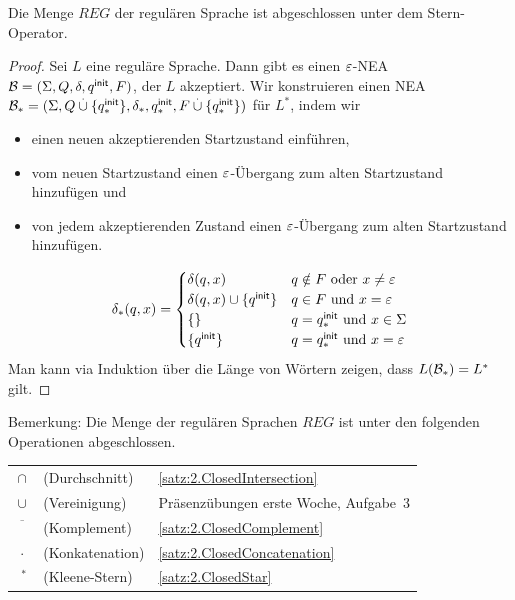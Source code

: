 \begin{lemma}\label{satz:2.ClosedStar}
Die Menge $REG$ der regulären Sprache ist abgeschlossen unter dem Stern-Operator.
\end{lemma}

\begin{proof}
Sei $L$ eine reguläre Sprache. Dann gibt es einen $\varepsilon$-NEA $\mathcal{B}=(\Sigma, Q, \delta, q^\mathsf{init}, F)$, der $L$ akzeptiert. 
Wir konstruieren einen NEA $\mathcal{B}_*=(\Sigma, Q\overset.\cup\{q^\mathsf{init}_*\}, \delta_*, q^\mathsf{init}_*, F\overset.\cup\{q^\mathsf{init}_*\})$ für $L^*$, indem wir
\begin{itemize}
 \item einen neuen akzeptierenden Startzustand einführen,
 \item vom neuen Startzustand einen $\varepsilon$-Übergang zum alten Startzustand hinzufügen und
 \item von jedem akzeptierenden Zustand einen $\varepsilon$-Übergang zum alten Startzustand hinzufügen.
\end{itemize}
\[
                \delta_*(q,x) =
                        \begin{cases}
                                \delta(q,x) & q\notin F \text{ oder } x \neq \varepsilon\\
                                \delta(q,x)\cup\{q^\mathsf{init}\} & q\in F \text{ und } x = \varepsilon \\
                                \{\} & q=q^\mathsf{init}_* \text{ und } x \in\Sigma\\
                                \{q^\mathsf{init}\} & q=q^\mathsf{init}_* \text{ und } x = \varepsilon
                        \end{cases}
\]
Man kann via Induktion über die Länge von Wörtern zeigen, dass $L(\mathcal{B}_*)=L^*$ gilt.
\end{proof}

Bemerkung: Die Menge der regulären Sprachen $REG$ ist unter den folgenden Operationen abgeschlossen.

\begin{center}
\begin{tabular}{cl@{\quad}l}
 $\cap$ & (Durchschnitt) & \autoref{satz:2.ClosedIntersection}\\
 $\cup$ & (Vereinigung) & Präsenzübungen erste Woche, Aufgabe~3\\
 $\overline{\phantom{X}}$ & (Komplement) & \autoref{satz:2.ClosedComplement}\\
 $\cdot$ & (Konkatenation) & \autoref{satz:2.ClosedConcatenation}\\
 $\phantom{\cdot}^*$ & (Kleene-Stern) & \autoref{satz:2.ClosedStar} 
\end{tabular}
\end{center}



